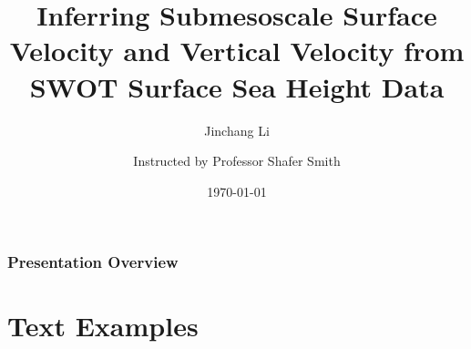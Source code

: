\documentclass[
	11pt, %
]{beamer}
\title[Project Outline]{Inferring Submesoscale Surface Velocity and Vertical Velocity from SWOT Surface Sea Height Data} %
\author[Jinchang Li]{Jinchang Li \and Instructed by Professor Shafer Smith} %
\institute[NYU]{New York University \\ \smallskip \textit{jl15535@nyu.edu}} %
\date[\today]{\today} %
\begin{document}

\begin{frame}
	\titlepage %
\end{frame}



\begin{frame}
	\frametitle{Presentation Overview} %
	
	\tableofcontents %
\end{frame}


\section{Text Examples} %
\end{document}
